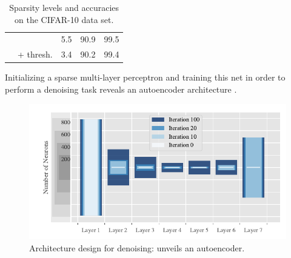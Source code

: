 \begin{minipage}[t]{\textwidth}
\begin{minipage}[b][\bottomstripheight][b]{.48\textwidth}
\begin{table}[htb]
\begin{minipage}{.69\textwidth}
\begin{tabularx}{\textwidth}{|c||c c|R R|}
\hhline{-----}
                &\LinBreg{} &5.5&90.9&99.5\\
                &\LinBreg{} + thresh.&3.4&90.2&99.4\\
\end{tabularx}
\end{minipage}%
\begin{minipage}{.01\textwidth}%
\phantom{2}
\end{minipage}%
%
\begin{minipage}{.3\textwidth}%
\caption{\small Sparsity levels and accuracies on the CIFAR-10 data set.}\label{tab:CIFAR}
\end{minipage}
\end{table}
%
%
%
%
%
%
\end{minipage}%
%
\hfill%
%
%
%
\hfill%
%
%
%
%
%
%
%
\noindent\begin{minipage}[b][\bottomstripheight][b]{.48\textwidth}%
%
%
\small%
Initializing a sparse multi-layer perceptron and training this net in order to perform a denoising task reveals an autoencoder architecture \cite{bungert21}. 

\begin{figure}%
\begin{minipage}{.3\textwidth}%
\caption{\small Architecture design for denoising: \LinBreg{} unveils an autoencoder.}
\end{minipage}%
\begin{minipage}{.7\textwidth}%
\includegraphics[width=\textwidth]{atelier/Encoder_3.pdf}
\end{minipage}%
\end{figure}
%
%
%
\vfill%
\end{minipage}%
\end{minipage}%
%

